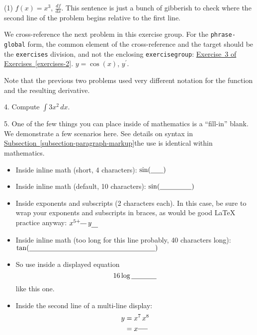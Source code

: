 \documentclass[10pt,]{article}
\newcommand{\fillin}[1]{\underline{\hspace{#1em}}}
\theoremstyle{plain}
\theoremstyle{definition}
\theoremstyle{definition}
\theoremstyle{definition}
\theoremstyle{definition}
\theoremstyle{definition}
\theoremstyle{definition}
\numberwithin{equation}{section}
\begin{document}
\begin{exerciselist}
\begin{exercisegroup}(1)
\exercise[2.]\hypertarget{exercise-5}{}\hypertarget{paragraph-in-exercise}{}%
\(f(x)=x^3\), \(\frac{df}{dx}\).  This sentence is just a bunch of gibberish to check where the second line of the problem begins relative to the first line.%
\par
\hypertarget{p-285}{}%
We cross-reference the next problem in this exercise group.  For the \lstinline?phrase-global? form, the common element of the cross-reference and the target should be the \lstinline?exercises? division, and not the enclosing \lstinline?exercisegroup?:  \hyperlink{exercises-cosine-derivative}{Exercise~3 of Exercises~\ref{exercises-2}}.%
\exercise[3.]\hypertarget{exercises-cosine-derivative}{}\hypertarget{p-286}{}%
\(y = \cos(x)\), \(y^\prime\).%
\end{exercisegroup}
\hypertarget{p-287}{}%
Note that the previous two problems used very different notation for the function and the resulting derivative.%
\par\smallskip\noindent
\item[4.]\hypertarget{exercise-7}{}\hypertarget{p-288}{}%
Compute \(\int 3x^2\,dx\).%
\par\smallskip
\item[5.]\hypertarget{exercise-8}{}\hypertarget{p-289}{}%
One of the few things you can place inside of mathematics is a ``fill-in'' blank.  We demonstrate a few scenarios here.  See details on syntax in \hyperref[subsection-paragraph-markup]{Subsection~\ref{subsection-paragraph-markup}}\textendash{}the use is identical within mathematics.\leavevmode%
\begin{itemize}[label=\textbullet]
\item{}\hypertarget{p-290}{}%
Inside inline math (short, 4 characters): \(\sin(\fillin{1.818181818181818})\)%
\item{}\hypertarget{p-291}{}%
Inside inline math (default, 10 characters): \(\sin(\fillin{4.545454545454546})\)%
\item{}\hypertarget{p-292}{}%
Inside exponents and subscripts (2 characters each).  In this case, be sure to wrap your exponents and subscripts in braces, as would be good \LaTeX{} practice anyway: \(x^{5+\fillin{0.909090909090909}}\,y_{\fillin{0.909090909090909}}\)%
\item{}\hypertarget{p-293}{}%
Inside inline math (too long for this line probably, 40 characters long): \(\tan(\fillin{18.1818181818182})\)%
\item{}\hypertarget{p-294}{}%
So use inside a displayed equation%
\begin{equation*}
16\log\space\fillin{3.636363636363636}
\end{equation*}
like this one.%
\item{}\hypertarget{p-295}{}%
Inside the second line of a multi-line display:%
\begin{align*}
y &= x^7\,x^8\\
&= x^{\fillin{1.363636363636364}}
\end{align*}
%
\end{itemize}
%
\par\smallskip
\end{exerciselist}
\end{document}
